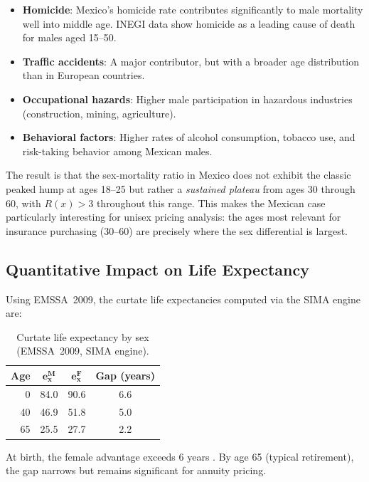 \documentclass[12pt,a4paper]{article}
\begin{document}
\begin{itemize}
  \item \textbf{Homicide}: Mexico's homicide rate contributes significantly to
        male mortality well into middle age. INEGI data show homicide as a
        leading cause of death for males aged 15--50.
  \item \textbf{Traffic accidents}: A major contributor, but with a broader age
        distribution than in European countries.
  \item \textbf{Occupational hazards}: Higher male participation in hazardous
        industries (construction, mining, agriculture).
  \item \textbf{Behavioral factors}: Higher rates of alcohol consumption,
        tobacco use, and risk-taking behavior among Mexican males.
\end{itemize}

The result is that the sex-mortality ratio in Mexico does not exhibit the
classic peaked hump at ages 18--25 but rather a \emph{sustained plateau} from
ages 30 through 60, with $R(x) > 3$ throughout this range. This makes the
Mexican case particularly interesting for unisex pricing analysis: the ages
most relevant for insurance purchasing (30--60) are precisely where the sex
differential is largest.

\subsection{Quantitative Impact on Life Expectancy}

Using EMSSA~2009, the curtate life expectancies computed via the SIMA engine are:

\begin{table}[H]
\centering
\caption{Curtate life expectancy by sex (EMSSA~2009, SIMA engine).}
\label{tab:life-exp}
\begin{tabular}{rccc}
\toprule
\textbf{Age} & $\bm{e_x^M}$ & $\bm{e_x^F}$ & \textbf{Gap (years)} \\
\midrule
 0 & 84.0 & 90.6 & 6.6 \\
40 & 46.9 & 51.8 & 5.0 \\
65 & 25.5 & 27.7 & 2.2 \\
\bottomrule
\end{tabular}
\end{table}

At birth, the female advantage exceeds 6 years \cite{colchero2016}. By age 65 (typical retirement),
the gap narrows but remains significant for annuity pricing.
\end{document}

